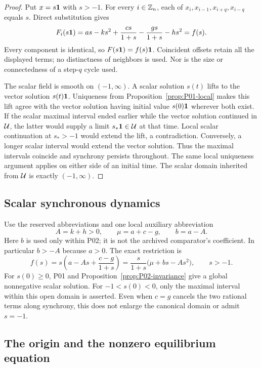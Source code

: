 \begin{proof}
Put $x=s\mathbf{1}$ with $s>-1$. For every $i\in\mathbb{Z}_n$, each of
$x_i,x_{i-1},x_{i+q},x_{i-q}$ equals $s$. Direct substitution gives
\[
 F_i(s\mathbf{1})=as-ks^2+\frac{cs}{1+s}
                        -\frac{gs}{1+s}-hs^2=f(s).
\]
Every component is identical, so $F(s\mathbf{1})=f(s)\mathbf{1}$.
Coincident offsets retain all the displayed terms; no distinctness
of neighbors is used. Nor is the size or connectedness of a
step-$q$ cycle used.

The scalar field is smooth on $(-1,\infty)$. A scalar solution
$s(t)$ lifts to the vector solution $s(t)\mathbf{1}$. Uniqueness from
Proposition~\ref{prop:P01-local} makes this lift agree with the
vector solution having initial value $s(0)\mathbf{1}$ wherever both exist.
If the scalar maximal interval ended earlier while the vector
solution continued in $\mathcal{U}$, the latter would supply a limit
$s_*\mathbf{1}\in\mathcal{U}$ at that time. Local scalar continuation at
$s_*>-1$ would extend the lift, a contradiction. Conversely, a longer
scalar interval would extend the vector solution. Thus the maximal
intervals coincide and synchrony persists throughout. The same local
uniqueness argument applies on either side of an initial time.
The scalar domain inherited from $\mathcal{U}$ is exactly $(-1,\infty)$.
\end{proof}

\subsection{Scalar synchronous dynamics}
\label{slot:P02-2}
Use the reserved abbreviations and one local auxiliary abbreviation
\begin{equation}
\label{eq:P02-abbreviations}
 A=k+h>0,\qquad \mu=a+c-g,\qquad b=a-A.
\end{equation}
Here $b$ is used only within P02; it is not the archived comparator's
coefficient. In particular $b>-A$ because $a>0$. The exact restriction is
\begin{equation}
\label{eq:P02-scalar}
 f(s)=s\left(a-As+\frac{c-g}{1+s}\right)
     =\frac{s}{1+s}\bigl(\mu+bs-As^2\bigr),\qquad s>-1.
\end{equation}
For $s(0)\ge0$, P01 and Proposition~\ref{prop:P02-invariance}
give a global nonnegative scalar solution. For $-1<s(0)<0$, only
the maximal interval within this open domain is asserted. Even when
$c=g$ cancels the two rational terms along synchrony, this does not
enlarge the canonical domain or admit $s=-1$.

\subsection{The origin and the nonzero equilibrium equation}

